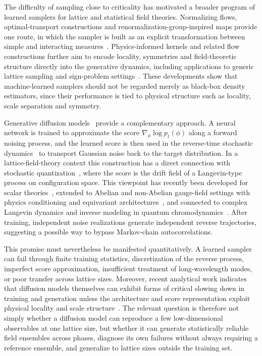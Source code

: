 \documentclass[reprint,twocolumn,superscriptaddress,preprintnumbers,amsmath,amssymb,aps,prd,floatfix]{revtex4-2}
\begin{document}
The difficulty of sampling close to criticality has motivated a broader program of learned samplers for lattice and statistical field theories. Normalizing flows, optimal-transport constructions and renormalization-group-inspired maps provide one route, in which the sampler is built as an explicit transformation between simple and interacting measures~\cite{Albergo:2019eim,DelDebbio:2021qwf,Singha:2022icw,Albergo:2022qfi,Finkenrath:2022ogg,Cotler:2022fze,Cranmer:2023xbe,Ihssen:2024ihp,Bauer:2024byr,Singha:2025lsd,Masuki:2025pfx}. Physics-informed kernels and related flow constructions further aim to encode locality, symmetries and field-theoretic structure directly into the generative dynamics, including applications to generic lattice sampling and sign-problem settings~\cite{Ihssen:2025ybn,Ihssen:2026njd}. These developments show that machine-learned samplers should not be regarded merely as black-box density estimators, since their performance is tied to physical structure such as locality, scale separation and symmetry.

Generative diffusion models~\cite{SongErmon2019,Ho2020DDPM,Song2021SDE} provide a complementary approach. A neural network is trained to approximate the score $\nabla_\phi\log p_t(\phi)$ along a forward noising process, and the learned score is then used in the reverse-time stochastic dynamics~\cite{Anderson1982} to transport Gaussian noise back to the target distribution. In a lattice-field-theory context this construction has a direct connection with stochastic quantization~\cite{Parisi:1980ys,Damgaard:1987rr}, where the score is the drift field of a Langevin-type process on configuration space. This viewpoint has recently been developed for scalar theories~\cite{Wang:2023exq,Wang:2023sry,Aarts:2024rsl,Hirono:2024zyg,Fukushima:2024oij}, 
extended to Abelian and non-Abelian gauge-field settings with physics conditioning and equivariant architectures~\cite{Zhu:2024kiu,Zhu:2025pmw,Aarts:2026zzr,Alharazin:2026lcb,Komijani:2026lan}, and connected to complex Langevin dynamics and inverse modeling in quantum chromodynamics~\cite{Aarts:2025lpi,Aarts:2025gyp}. After training, independent noise realizations generate independent reverse trajectories, suggesting a possible way to bypass Markov-chain autocorrelations.

This promise must nevertheless be manifested quantitatively. A learned sampler can fail through finite training statistics, discretization of the reverse process, imperfect score approximation, insufficient treatment of long-wavelength modes, or poor transfer across lattice sizes. Moreover, recent analytical work indicates that diffusion models themselves can exhibit forms of critical slowing down in training and generation unless the architecture and score representation exploit physical locality and scale structure~\cite{2605.12597}. The relevant question is therefore not simply whether a diffusion model can reproduce a few low-dimensional observables at one lattice size, but whether it can generate statistically reliable field ensembles across phases, diagnose its own failures without always requiring a reference ensemble, and generalize to lattice sizes outside the training set.
\end{document}
